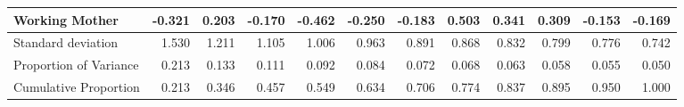 \begin{tabular}{lrrrrrrrrrrr}
\hspace{1em}Working Mother & -0.321 & 0.203 & -0.170 & -0.462 & -0.250 & -0.183 & 0.503 & 0.341 & 0.309 & -0.153 & -0.169\\
\midrule
\hspace{1em}Standard deviation & 1.530 & 1.211 & 1.105 & 1.006 & 0.963 & 0.891 & 0.868 & 0.832 & 0.799 & 0.776 & 0.742\\
\hspace{1em}Proportion of Variance & 0.213 & 0.133 & 0.111 & 0.092 & 0.084 & 0.072 & 0.068 & 0.063 & 0.058 & 0.055 & 0.050\\
\hspace{1em}Cumulative Proportion & 0.213 & 0.346 & 0.457 & 0.549 & 0.634 & 0.706 & 0.774 & 0.837 & 0.895 & 0.950 & 1.000\\
\bottomrule
\end{tabular}

